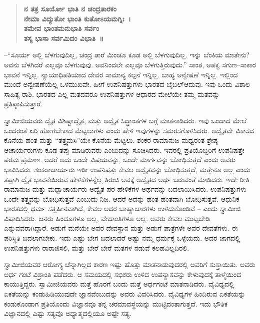 \begin{verse}
\textbf{ನ ತತ್ರ ಸೂರ್ಯೋ ಭಾತಿ ನ ಚಂದ್ರತಾರಕಂ}\\\textbf{ನೇಮಾ ವಿದ್ಯುತೋ ಭಾಂತಿ ಕುತೋಽಯಮಗ್ನಿಃ~।}\\\textbf{ತಮೇವ ಭಾಂತಮನುಭಾತಿ ಸರ್ವಂ}\\\textbf{ತಸ್ಯ ಭಾಸಾ ಸರ್ವಮಿದಂ ವಿಭಾತಿ~॥}
\end{verse}

–“ಸೂರ್ಯ ಅಲ್ಲಿ ಬೆಳಗುವುದಿಲ್ಲ, ಚಂದ್ರ ತಾರೆ ಮಿಂಚೂ ಕೂಡ ಅಲ್ಲಿ ಬೆಳಗುವುದಿಲ್ಲ. ಇನ್ನು ಬೆಂಕಿಯ ಮಾತೇನು? ಅವನು ಬೆಳಗಿದರೆ ಎಲ್ಲವೂ ಬೆಳಗುವುವು. ಅವನಿಂದಲೇ ಎಲ್ಲವೂ ಬೆಳಗುತ್ತಿರುವುದು.” ಸಾಂತ, ಅಪಕ್ವ ಸಗುಣ–ಸಾಕಾರ ಭಾವನೆ ಇನ್ನಿಲ್ಲ. ನ್ಯಾಯಾಧಿಪತಿಯಾದ ದೇವರ ಸಾಮಾನ್ಯ ಕಲ್ಪನೆ ಇನ್ನಿಲ್ಲ. ಬಾಹ್ಯ ಅನ್ವೇಷಣೆ ಇನ್ನಿಲ್ಲ. ಇಲ್ಲಿಂದ ಮುಂದೆ ಅನ್ವೇಷಣೆಯೆಲ್ಲ ಒಳಮುಖವೇ. ಹೀಗೆ ಉಪನಿಷತ್ತುಗಳು ಭಾರತದ ಬೈಬಲ್​ ಆದುವು. ಇವು ಒಂದು ವಿಶಾಲ ಸಾಹಿತ್ಯ ರಾಶಿ. ಭಾರತದ ಎಲ್ಲ ಮತದವರೂ ಉಪನಿಷತ್ತುಗಳ ಆಧಾರದ ಮೇಲೆಯೇ ತಮ್ಮ ಮತವನ್ನು ಪ್ರತಿಪ್ಠಾಪಿಸುತ್ತಾರೆ. 

ಸ್ವಾಮೀಜಿಯವರು ದ್ವೈತ ವಿಶಿಷ್ಟಾದ್ವೈತ, ಮತ್ತು ಅದ್ವೈತ ಸಿದ್ಧಾಂತಗಳ ಬಗ್ಗೆ ಮಾತನಾಡಿದರು. ಇವು ಒಂದಾದ ಮೇಲೆ ಒಂದರಂತೆ ಏರಿ ಹೋಗಬೇಕಾದ ಮೆಟ್ಟಲುಗಳು ಎಂದು ಹೇಳಿ ಇವುಗಳನ್ನು ಸಮರಸಗೊಳಿಸಿದರು. ಅದ್ವೈತವೇ ವಿಕಾಸದ ಕೊನೆಯ ಹಂತ ಮತ್ತು “ತತ್ತ್ವಮಸಿ”ಯೇ ಕೊನೆಯ ಮೆಟ್ಟಲು. ಶಂಕರ ರಾಮಾನುಜ ಮಧ್ವರಂತ ಶ್ರೇಷ್ಠ ಆಚಾರ್ಯರುಗಳು ಕೂಡ ತಪ್ಪು ಮಾಡಿರುವರು ಎಂಬುದನ್ನು ಸೂಚಿಸಿದರು. ಇವರಲ್ಲಿ ಪ್ರತಿಯೊಬ್ಬರಿಗೆ ಉಪನಿಷತ್ತೇ ಪರಮ ಪ್ರಮಾಣ. ಆದರೆ ಅದು ಒಂದೇ ವಿಷಯವನ್ನು, ಒಂದೇ ಮಾರ್ಗವನ್ನು ಬೋಧಿಸುತ್ತದೆ ಎಂದು ಅವರು ಭಾವಿಸಿದರು. ಶಂಕರಾಚಾರ್ಯರು ಇಡೀ ಉಪನಿಷತ್ತು ಕೇವಲ ಅದ್ವೈತವನ್ನು ಬೋಧಿಸುತ್ತದೆ, ಮತ್ತೇನೂ ಅಲ್ಲ ಎಂದು ತಪ್ಪಾಗಿ ದ್ವೈತ ಭಾವನೆಯಿರುವ ಹೇಳಿಕೆಗಳನ್ನೆಲ್ಲ ತಿರುಚಿ ಅವಕ್ಕೆ ಅದ್ವೈತದ ಅರ್ಥ ಬರುವಂತೆ ಮಾಡಿದರು. ಇದೇ ರೀತಿ ರಾಮಾನುಜ ಮತ್ತು ಮಧ್ವಾಚಾರ್ಯರು ಅದ್ವೈತ ಪರ ಹೇಳಿಕೆಗಳ ಅರ್ಥವನ್ನು ಬದಲಾಯಿಸಿದರು. ಉಪನಿಷತ್ತುಗಳು ಒಂದೇ ತತ್ತ್ವವನ್ನು ಬೋಧಿಸುತ್ತವೆ ಎಂಬುದು ನಿಜ. ಆದರೆ ಅದನ್ನು ಹಂತ ಹಂತವಾಗಿ ಬೋಧಿಸುತ್ತವೆ. ಆಧುನಿಕ ಭಾರತದಲ್ಲಿ ಧರ್ಮ ಸತ್ವಹೀನವಾಗಿದೆ, ಕೇವಲ ಅದರ ಬಾಹ್ಯಾಚಾರಗಳು ಉಳಿದುಕೊಂಡಿವೆ – ಎಂದು ಸ್ವಾಮೀಜಿ ವಿಷಾದಿಸಿದರು. ಜನರು ಹಿಂದೂಗಳೂ ಅಲ್ಲ, ವೇದಾಂತಿಗಳೂ ಅಲ್ಲ. ಅವರು ಕೇವಲ ಮುಟ್ಟಬೇಡಿ ಎನ್ನುವವರಾಗಿದ್ದಾರೆ. ಅಡುಗೆ ಮನೆಯೇ ಅವರ ದೇವಸ್ಥಾನ ಮತ್ತು ಅಡುಗೆ ಪಾತ್ರೆಗಳೇ ಅವರ ದೇವತೆಗಳು. ಈ ಪರಿಸ್ಥಿತಿ ಬದಲಾಗಬೇಕು. ಇದು ಎಷ್ಟು ಬೇಗ ಬದಲಾದರೆ ಅಷ್ಟು ನಮ್ಮ ಧರ್ಮಕ್ಕೆ ಒಳ್ಳೆಯದು. ಅದರ ಜಾಗದಲ್ಲಿ ಉಪನಿಷತ್ತುಗಳು ರಾರಾಜಿಸಲಿ, ಮತ್ತು ಬೇರೆ ಬೇರೆ ಮತಗಳ ನಡುವೆ ಕಲಹವಿಲ್ಲದಿರಲಿ. 

ಸ್ವಾಮೀಜಿಯವರ ಆರೋಗ್ಯ ಚೆನ್ನಾಗಿಲ್ಲದ ಕಾರಣ ಇಷ್ಟು ಹೊತ್ತು ಮಾತನಾಡುವುದರಲ್ಲಿ ಅವರಿಗೆ ಸುಸ್ತಾಯಿತು. ಅವರು ಅರ್ಧ ಗಂಟೆ ವಿಶ್ರಾಂತಿ ಪಡೆದರು. ಆ ಸಮಯದಲ್ಲಿ ಸಭಿಕರು ಉಳಿದ ಉಪನ್ಯಾಸವನ್ನು ಕೇಳುವುದಕ್ಕೆ ತಾಳ್ಮೆಯಿಂದ ಕಾಯುತ್ತಿದ್ದರು. ಸ್ವಾಮೀಜಿಯವರು ಮತ್ತೆ ಹೊರಗೆ ಬಂದು ಮತ್ತೆ ಅರ್ಧಗಂಟೆ ಮಾತನಾಡಿದರು. ವೈವಿಧ್ಯದಲ್ಲಿ ಏಕತೆಯನ್ನು ಕಂಡುಹಿಡಿಯುವುದೇ ಜ್ಞಾನವೆಂಬುದನ್ನು ಅವರು ವಿವರಿಸಿದರು. ವೈವಿಧ್ಯಗಳ ಹಿಂದಿರುವ ಏಕತೆಯನ್ನು ಕಂಡುಕೊಂಡಾಗ ಪ್ರತಿಯೊಂದು ವಿಜ್ಞಾನವೂ ತನ್ನ ಚರಮಾವಸ್ಥೆಯನ್ನು ಮುಟ್ಟಿದಂತಾಗುತ್ತದೆ. ಇದು ಭೌತಿಕ ವಿಜ್ಞಾನದಲ್ಲಿ ಎಷ್ಟು ಸತ್ಯವೊ ಅಧ್ಯಾತ್ಮದಲ್ಲಿಯೂ ಅಷ್ಟೇ ಸತ್ಯ. 

